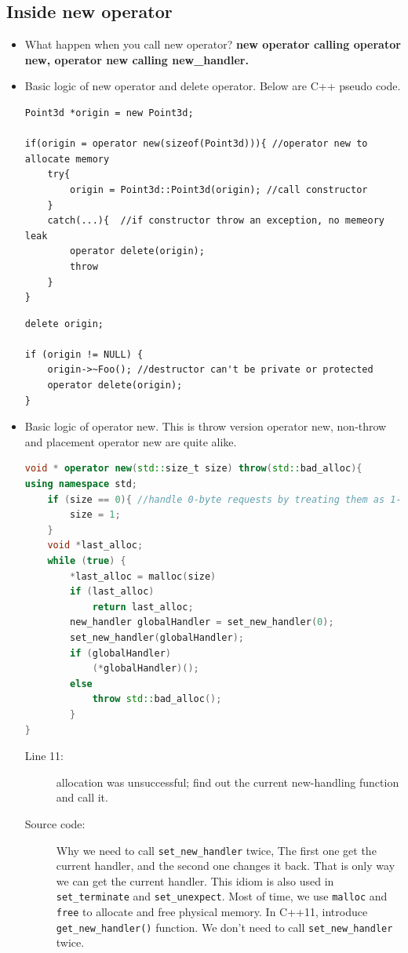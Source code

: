 \documentclass[a4paper,11pt,twoside]{book}
\begin{document}
\subsection{Inside new operator}
\begin{itemize}
    \item What happen when you call new operator? \textbf{new operator calling operator new, operator new calling new\_handler.} 
	
	\item Basic logic of new operator and delete operator. Below are C++ pseudo code.
\begin{lstlisting}[]
Point3d *origin = new Point3d;
	
if(origin = operator new(sizeof(Point3d))){ //operator new to allocate memory
	try{
		origin = Point3d::Point3d(origin); //call constructor
	}
	catch(...){  //if constructor throw an exception, no memeory leak
		operator delete(origin);
		throw
	}
}
\end{lstlisting}
	
\begin{lstlisting}[]
delete origin;
	
if (origin != NULL) {
	origin->~Foo(); //destructor can't be private or protected
	operator delete(origin);
}
\end{lstlisting}
	
\item Basic logic of operator new. This is throw version operator new, non-throw and placement operator new are quite alike. 
\begin{lstlisting}[frame=single, language=c++]
void * operator new(std::size_t size) throw(std::bad_alloc){
using namespace std; 
	if (size == 0){ //handle 0-byte requests by treating them as 1-byte request   
		size = 1;             
	}                 
	void *last_alloc;
	while (true) {
		*last_alloc = malloc(size)
		if (last_alloc)
			return last_alloc;
		new_handler globalHandler = set_new_handler(0);
		set_new_handler(globalHandler);
		if (globalHandler) 
			(*globalHandler)();
		else 
			throw std::bad_alloc();
		}
}
	\end{lstlisting}
\begin{description}	
	\item[Line 11:] allocation was unsuccessful; find out the current new-handling function and call it.

    \item[Source code:] Why we need to call \texttt{set\_new\_handler} twice, The first one get the current handler, and the second one changes it back. That is only way we can get the current handler. This idiom is also used in \texttt{set\_terminate} and \texttt{set\_unexpect}. Most of time, we use \texttt{malloc} and \texttt{free} to allocate and free physical memory. In C++11, introduce \texttt{get\_new\_handler()} function. We don't need to call \texttt{set\_new\_handler} twice. 
\end{description}


\end{itemize}
\end{document}
